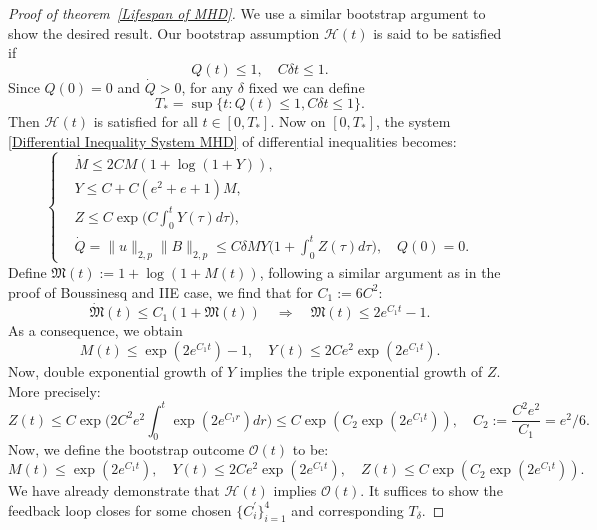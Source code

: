 \documentclass[12pt,letterpaper]{article}
\theoremstyle{plain}
\begin{document}
\begin{proof}[Proof of theorem~\ref{Lifespan of MHD}]

We use a similar bootstrap argument to show the desired result. Our bootstrap assumption $\mathscr H(t)$ is said to be satisfied if
\begin{equation*}
Q(t)\le 1,\quad C\delta t\le 1.  
\end{equation*}
Since $Q(0)=0$ and $\dot Q>0$, for any $\delta$ fixed we can define
\begin{equation*}
 T_*=\sup\{ t:Q(t)\le 1, C\delta t\le 1\}.   
\end{equation*}
Then $\mathscr H(t)$ is satisfied for all $t\in [0,T_*]$. Now on $[0,T_*]$, the system \eqref{Differential Inequality System MHD} of differential inequalities becomes:
\begin{equation}\label{Differential Inequality System MHD, Simplified}
\left\{
\begin{aligned}
&\dot M\le 2 CM(1+\log (1+Y)),\\
&Y\le  C+C(e^2+e+1)M,\\
&Z\le C\exp\bigg(C\int_0^t Y(\tau)d\tau\bigg),\\
& \dot Q=\lVert u\rVert_{2,p}\lVert B\rVert_{2,p}\le C\delta MY\bigg(1+\int_0^t Z(\tau)d\tau\bigg),\quad Q(0)=0.
\end{aligned}
\right.    
\end{equation}
Define $\mathfrak M(t):=1+\log(1+M(t))$, following a similar argument as in the proof of Boussinesq and IIE case, we find that for $C_1:=6C^2$:  
\begin{equation*}
 \dot{\mathfrak M}(t)\le C_1(1+\mathfrak M(t))\quad \Longrightarrow\quad \mathfrak M(t)\le 2e^{C_1t}-1.
\end{equation*}
As a consequence, we obtain
\begin{equation*}
  M(t)\le \exp(2e^{C_1t})-1,\quad Y(t)\le 2Ce^2 \exp(2e^{C_1t}).
\end{equation*}
Now, double exponential growth of $Y$ implies the triple exponential growth of $Z$. More precisely:
\begin{equation*}
 Z(t)\le C\exp\bigg(2C^2e^2\int_0^t   \exp(2e^{C_1r})dr\bigg)\le C\exp(C_2\exp(2e^{C_1t})),\quad C_2:=\frac{C^2e^2}{C_1}=e^2/6.
\end{equation*}
Now, we define the bootstrap outcome $\mathscr O(t)$ to be:
\begin{equation*}
M(t)\le \exp(2e^{C_1t}),\quad Y(t)\le 2Ce^2 \exp(2e^{C_1t}),\quad Z(t) \le C\exp(C_2\exp(2e^{C_1t})) .
\end{equation*}
We have already demonstrate that $\mathscr H(t)$ implies $\mathscr O(t)$. It suffices to show the feedback loop closes for some chosen $\{C_i^\prime\}_{i=1}^4$ and corresponding $T_\delta$. 


\end{proof}
\end{document}
